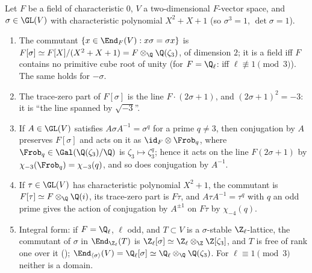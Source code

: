 \begin{proposition}\label{prop:ant:commutant}
Let $F$ be a field of characteristic $0$, $V$ a two-dimensional $F$-vector space, and $\sigma\in\GL(V)$ with characteristic polynomial $X^2+X+1$ (so
$\sigma^3=1$, $\det\sigma=1$).
\begin{enumerate}[label=(\roman*)]
\item The commutant $\{x\in\End_F(V):x\sigma=\sigma x\}$ is $F[\sigma]\simeq F[X]/(X^2+X+1)=F\otimes_\Q\Q(\zeta_3)$, of dimension $2$; it is a field iff $F$
contains no primitive cube root of unity (for $F=\Q_\ell$: iff $\ell\not\equiv1\pmod3$). The same holds for $-\sigma$.
\item The trace-zero part of $F[\sigma]$ is the line $F\cdot(2\sigma+1)$, and $(2\sigma+1)^2=-3$: it is ``the line spanned by $\sqrt{-3}$''.
\item If $A\in\GL(V)$ satisfies $A\sigma A^{-1}=\sigma^q$ for a prime $q\ne3$, then conjugation by $A$ preserves $F[\sigma]$ and acts on it as
$\id_F\otimes\Frob_q$, where $\Frob_q\in\Gal(\Q(\zeta_3)/\Q)$ is $\zeta_3\mapsto\zeta_3^q$; hence it acts on the line $F(2\sigma+1)$ by $\chi_{-3}(\Frob_q)=\chi_{-3}(q)$,
and so does conjugation by $A^{-1}$.
\item If $\tau\in\GL(V)$ has characteristic polynomial $X^2+1$, the commutant is $F[\tau]\simeq F\otimes_\Q\Q(i)$, its trace-zero part is $F\tau$, and
$A\tau A^{-1}=\tau^q$ with $q$ an odd prime gives the action of conjugation by $A^{\pm1}$ on $F\tau$ by $\chi_{-4}(q)$.
\item Integral form: if $F=\Q_\ell$, $\ell$ odd, and $T\subset V$ is a $\sigma$-stable $\Z_\ell$-lattice, the commutant of $\sigma$ in $\End_{\Z_\ell}(T)$ is
$\Z_\ell[\sigma]\simeq\Z_\ell\otimes_\Z\Z[\zeta_3]$, and $T$ is free of rank one over it (); $\End_{\langle\sigma\rangle}(V)=\Q_\ell[\sigma]\simeq
\Q_\ell\otimes_\Q\Q(\zeta_3)$. For $\ell\equiv1\pmod3$ neither is a domain.
\end{enumerate}
\end{proposition}

